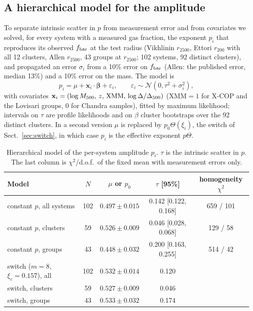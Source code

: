\documentclass[11pt,a4paper]{article}
\newcommand{\fbar}{f_{\rm bar}}
\begin{document}
\subsection{A hierarchical model for the amplitude}
\label{sec:hier}
To separate intrinsic scatter in $p$ from measurement error and from covariates we solved, for every system with a measured gas fraction, the exponent $p_i$ that reproduces its observed $\fbar$ at the test radius (Vikhlinin $r_{2500}$, Ettori $r_{200}$ with all 12 clusters, Allen $r_{2500}$, 43 groups at $r_{2500}$; 102 systems, 92 distinct clusters), and propagated an error $\sigma_i$ from a 10\% error on $\fbar$ (Allen: the published error, median 13\%) and a 10\% error on the mass. The model is
\[
p_i=\mu+\mathbf{x}_i\cdot\boldsymbol\beta+\varepsilon_i,\qquad \varepsilon_i\sim\mathcal N(0,\tau^2+\sigma_i^2),
\]
with covariates $\mathbf{x}_i=(\log M_{500},\,z,\,{\rm XMM},\,\log\Delta/\Delta_{500})$ (XMM$=1$ for X-COP and the Lovisari groups, 0 for Chandra samples), fitted by maximum likelihood; intervals on $\tau$ are profile likelihoods and on $\beta$ cluster bootstraps over the 92 distinct clusters. In a second version $\mu$ is replaced by $p_0\Theta(\xi_i)$, the switch of Sect.~\ref{sec:switch}, in which case $p_i$ is the effective exponent $p\Theta$.

\begin{table}[h]
\centering\small
\begin{tabular}{lcccc}
\toprule
Model & $N$ & $\mu$ or $p_0$ & $\tau$ [95\%] & homogeneity $\chi^2$ \\
\midrule
constant $p$, all systems & 102 & $0.497\pm0.015$ & 0.142 [0.122, 0.168] & 659 / 101 \\
constant $p$, clusters & 59 & $0.526\pm0.009$ & 0.046 [0.028, 0.068] & 129 / 58 \\
constant $p$, groups & 43 & $0.448\pm0.032$ & 0.200 [0.163, 0.255] & 514 / 42 \\
switch ($m=8$, $\xi_c=0.157$), all & 102 & $0.532\pm0.014$ & 0.120 & \\
switch, clusters & 59 & $0.527\pm0.009$ & 0.046 & \\
switch, groups & 43 & $0.533\pm0.032$ & 0.174 & \\
\bottomrule
\end{tabular}
\caption{Hierarchical model of the per-system amplitude $p_i$. $\tau$ is the intrinsic scatter in $p$. The last column is $\chi^2$/d.o.f.\ of the fixed mean with measurement errors only.}
\label{tab:hier}
\end{table}
\end{document}
